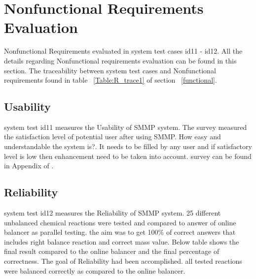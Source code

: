 \documentclass[12pt, titlepage]{article}
\begin{document}
\section{Nonfunctional Requirements Evaluation}

Nonfunctional Requirements evaluated in system test cases id11 - id12. All the details regarding Nonfunctional requirements evaluation can be found in this section. The traceability between system test cases and Nonfunctional requirements found in table ~\ref{Table:R_trace1} of section ~\ref{functional}.


\subsection{Usability}

system test id11 measures the Usability of SMMP system. The survey measured the satisfaction level of potential user after using SMMP. How easy and understandable the system is?. It needs to be filled by any user and if satisfactory level is low then enhancement need to be taken into account. survey can be found in Appendix of  \cite{SystemVnVPlan}.
		
\subsection{Reliability}

system test id12 measures the Reliability of SMMP system. 25 different unbalanced chemical reactions were tested and compared to answer of online balancer  \cite{OnlineBalancer} as parallel testing. the aim was to get 100\% of correct answers that includes right balance reaction and correct mass value. Below table shows the final result compared to the online balancer and the final percentage of correctness.
The goal of Reliability had been accomplished. all tested reactions were balanced correctly as compared to the online balancer.
\end{document}
